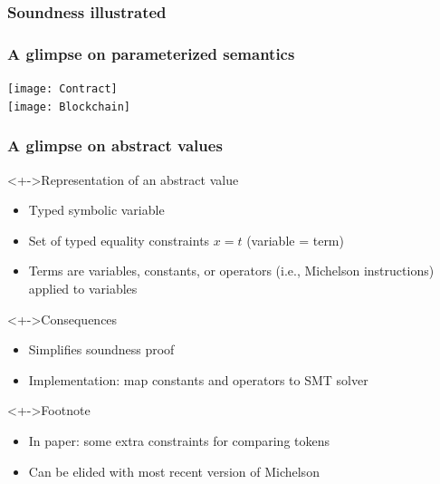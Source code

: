 \documentclass[aspectratio=1610]{beamer}
\begin{document}
\begin{frame}
  \frametitle{Soundness illustrated}
  \begin{center}
\end{center}
\end{frame}
\begin{frame}
  \frametitle{A glimpse on parameterized semantics}
  \begin{flushleft}
    \texttt{[image: Contract]}
    \\
    \texttt{[image: Blockchain]}
  \end{flushleft}
\end{frame}
\begin{frame}
  \frametitle{A glimpse on abstract values}
  \begin{block}<+->{Representation of an abstract value}
    \begin{itemize}
    \item Typed symbolic variable
    \item Set of typed equality constraints \quad $x = t$ \quad (variable = term)
    \item Terms are variables, constants, or operators (i.e., Michelson instructions) applied to variables
    \end{itemize}
  \end{block}
  \begin{block}<+->{Consequences}
    \begin{itemize}
    \item Simplifies soundness proof
    \item Implementation: map constants and operators to SMT solver
    \end{itemize}
  \end{block}
  \begin{block}<+->{Footnote}
    \begin{itemize}
    \item In paper: some extra constraints for comparing tokens
    \item Can be elided with most recent version of Michelson
    \end{itemize}
  \end{block}
\end{frame}
\end{document}
